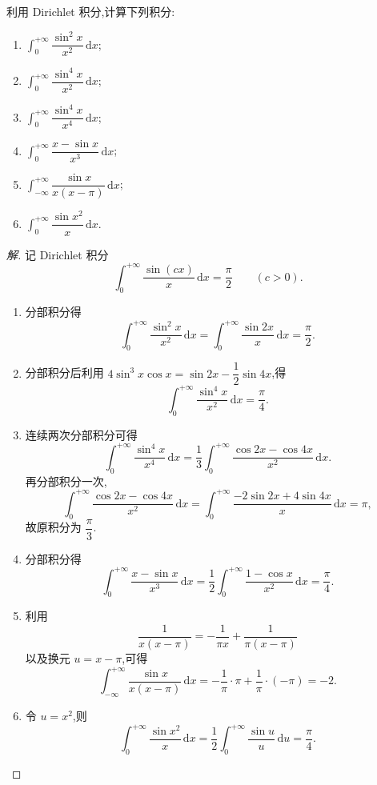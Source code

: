 \documentclass[../../数学分析培优讲义(答案版).tex]{subfiles}
\begin{document}
\begin{example}
利用 Dirichlet 积分,计算下列积分:
\begin{enumerate}[label=(\arabic*)]
    \item $\displaystyle\int_0^{+\infty}\dfrac{\sin^2x}{x^2}\,\mathrm{d}x$;
    \item $\displaystyle\int_0^{+\infty}\dfrac{\sin^4x}{x^2}\,\mathrm{d}x$;
    \item $\displaystyle\int_0^{+\infty}\dfrac{\sin^4x}{x^4}\,\mathrm{d}x$;
    \item $\displaystyle\int_0^{+\infty}\dfrac{x-\sin x}{x^3}\,\mathrm{d}x$;
    \item $\displaystyle\int_{-\infty}^{+\infty}\dfrac{\sin x}{x(x-\pi)}\,\mathrm{d}x$;
    \item $\displaystyle\int_0^{+\infty}\dfrac{\sin x^2}{x}\,\mathrm{d}x$.
\end{enumerate}
\end{example}

\begin{proof}[解]
记 Dirichlet 积分
\[
    \int_0^{+\infty}\dfrac{\sin(cx)}{x}\,\mathrm{d}x=\dfrac{\pi}{2}
    \qquad(c>0).
\]
\begin{enumerate}[label=(\arabic*)]
    \item 分部积分得
    \[
        \int_0^{+\infty}\dfrac{\sin^2x}{x^2}\,\mathrm{d}x
        =\int_0^{+\infty}\dfrac{\sin2x}{x}\,\mathrm{d}x=\dfrac{\pi}{2}.
    \]
    \item 分部积分后利用
    $4\sin^3x\cos x=\sin2x-\dfrac{1}{2}\sin4x$,得
    \[
        \int_0^{+\infty}\dfrac{\sin^4x}{x^2}\,\mathrm{d}x
        =\dfrac{\pi}{4}.
    \]
    \item 连续两次分部积分可得
    \[
        \int_0^{+\infty}\dfrac{\sin^4x}{x^4}\,\mathrm{d}x
        =\dfrac{1}{3}\int_0^{+\infty}\dfrac{\cos2x-\cos4x}{x^2}\,\mathrm{d}x.
    \]
    再分部积分一次,
    \[
        \int_0^{+\infty}\dfrac{\cos2x-\cos4x}{x^2}\,\mathrm{d}x
        =\int_0^{+\infty}\dfrac{-2\sin2x+4\sin4x}{x}\,\mathrm{d}x=\pi,
    \]
    故原积分为 $\dfrac{\pi}{3}$.
    \item 分部积分得
    \[
        \int_0^{+\infty}\dfrac{x-\sin x}{x^3}\,\mathrm{d}x
        =\dfrac{1}{2}\int_0^{+\infty}\dfrac{1-\cos x}{x^2}\,\mathrm{d}x
        =\dfrac{\pi}{4}.
    \]
    \item 利用
    \[
        \dfrac{1}{x(x-\pi)}=-\dfrac{1}{\pi x}+\dfrac{1}{\pi(x-\pi)}
    \]
    以及换元 $u=x-\pi$,可得
    \[
        \int_{-\infty}^{+\infty}\dfrac{\sin x}{x(x-\pi)}\,\mathrm{d}x
        =-\dfrac{1}{\pi}\cdot\pi+\dfrac{1}{\pi}\cdot(-\pi)=-2.
    \]
    \item 令 $u=x^2$,则
    \[
        \int_0^{+\infty}\dfrac{\sin x^2}{x}\,\mathrm{d}x
        =\dfrac{1}{2}\int_0^{+\infty}\dfrac{\sin u}{u}\,\mathrm{d}u
        =\dfrac{\pi}{4}.
    \]
\end{enumerate}
\end{proof}
\end{document}
